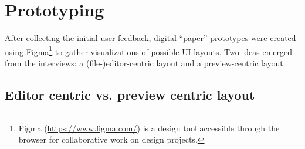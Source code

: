 
%
\chapter{Prototyping}
\label{chap:prototyping} 

After collecting the initial user feedback, digital ``paper'' prototypes were created using Figma\footnote{Figma (\url{https://www.figma.com/}) is a design tool accessible through the browser for collaborative work on design projects.} to gather visualizations of possible UI layouts.
Two ideas emerged from the interviews: a (file-)editor-centric layout and a preview-centric layout.
\section{Editor centric vs. preview centric layout}


